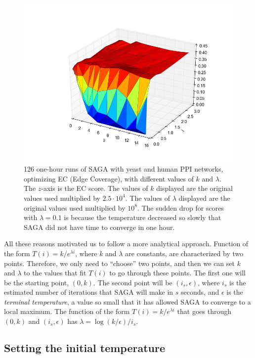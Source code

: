 \documentclass[]{article}
\begin{document}
\begin{figure}
\centering
\includegraphics[width=0.99\linewidth]{../figures/temperature}
\caption[Temperature schedule]{126 one-hour runs of SAGA with yeast and human PPI networks, optimizing EC (Edge Coverage), with different values of $k$ and $\lambda$. The $z$-axis is the EC score. The values of $k$ displayed are the original values used multiplied by $2.5\cdot 10^{4}$. The values of $\lambda$ displayed are the original values used multiplied by $10^{8}$. The sudden drop for scores with $\lambda=0.1$ is because the temperature decreased so slowly that SAGA did not have time to converge in one hour.}
\label{fig:temperature}
\end{figure}

All these reasons motivated us to follow a more analytical approach. Function of the form $T(i)=k/e^{\lambda i}$, where $k$ and $\lambda$ are constants, are characterized by two points. Therefore, we only need to ``choose'' two points, and then we can set $k$ and $\lambda$ to the values that fit $T(i)$ to go through these points. The first one will be the starting point, $(0,k)$. The second point will be $(i_s,\epsilon)$, where $i_s$ is the estimated number of iterations that SAGA will make in $s$ seconds, and $\epsilon$ is the \textit{terminal temperature}, a value so small that it has allowed SAGA to converge to a local maximum. The function of the form $T(i)=k/e^{\lambda i}$ that goes through $(0,k)$ and $(i_s,\epsilon)$ has $\lambda=\log(k/\epsilon)/i_s$.

\subsection{Setting the initial temperature}
\end{document}
